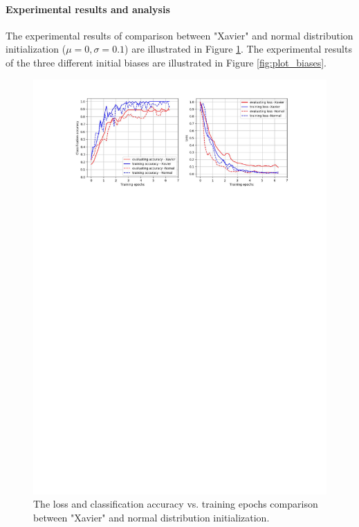 \paragraph{Experimental results and analysis}
 
The experimental results of comparison between "Xavier" and normal distribution initialization (\(\mu = 0, \sigma = 0.1\)) are illustrated in Figure \ref{fig:plot_xavier_vs_normal}.  The experimental results of the three different initial biases are illustrated in Figure \ref{fig:plot_biases}. 

\begin{figure}
	\includegraphics[trim=3cm 22cm 0cm 1cm]{fig01/plot_xavier_vs_normal.pdf}
	\caption{The loss and classification accuracy vs. training epochs comparison between "Xavier" and normal distribution initialization.}
	\label{fig:plot_xavier_vs_normal}
\end{figure}

